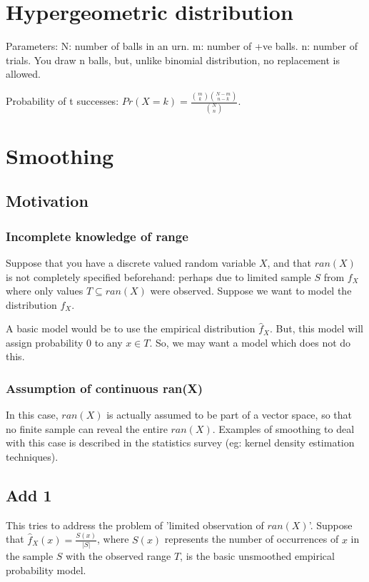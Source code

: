 \documentclass[oneside, article]{memoir}
\begin{document}
\section{Hypergeometric distribution}
Parameters: N: number of balls in an urn. m: number of +ve balls. n: number of trials. You draw n balls, but, unlike binomial distribution, no replacement is allowed.

Probability of t successes: $Pr(X = k) = \frac{\binom{m}{k} \binom{N-m}{n-k}}{\binom{N}{n}}$.

\section{Smoothing}
\subsection{Motivation}
\subsubsection{Incomplete knowledge of range}
Suppose that you have a discrete valued random variable $X$, and that $ran(X)$ is not completely specified beforehand: perhaps due to limited sample $S$ from $f_X$ where only values $T \subseteq ran(X)$ were observed. Suppose we want to model the distribution $f_X$.

A basic model would be to use the empirical distribution $\hat{f}_X$. But, this model will assign probability 0 to any $x \in T$. So, we may want a model which does not do this.

\subsubsection{Assumption of continuous ran(X)}
In this case, $ran(X)$ is actually assumed to be part of a vector space, so that no finite sample can reveal the entire $ran(X)$. Examples of smoothing to deal with this case is described in the statistics survey (eg: kernel density estimation techniques).

\subsection{Add 1}
This tries to address the problem of 'limited observation of $ran(X)$'. Suppose that $\hat{f}_X(x) = \frac{S(x)}{|S|}$, where $S(x)$ represents the number of occurrences of $x$ in the sample $S$ with the observed range $T$, is the basic unsmoothed empirical probability model. 
\end{document}
